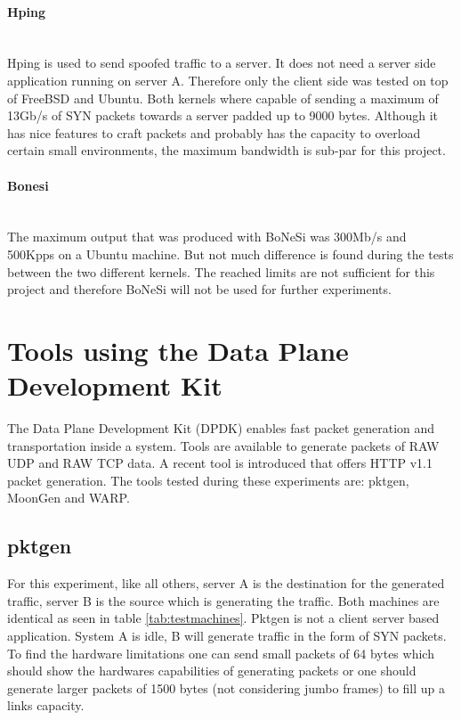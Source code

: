 \paragraph{Hping}\mbox{}\\
Hping is used to send spoofed traffic to a server. 
It does not need a server side application running on server A. Therefore only the client side was tested on top of FreeBSD and Ubuntu.
Both kernels where capable of sending a maximum of 13Gb/s of SYN packets towards a server padded up to 9000 bytes. Although it has nice features to craft packets and probably has the capacity to overload certain small environments, the maximum bandwidth is sub-par for this project.  

\paragraph{Bonesi}\mbox{}\\
The maximum output that was produced with BoNeSi was 300Mb/s and 500Kpps on a Ubuntu machine. 
But not much difference is found during the tests between the two different kernels.
The reached limits are not sufficient for this project and therefore BoNeSi will not be used for further experiments. 

\section{Tools using the Data Plane Development Kit}
The Data Plane Development Kit (DPDK) enables fast packet generation and transportation inside a system. Tools are available to generate packets of RAW UDP and RAW TCP data. A recent tool is introduced that offers HTTP v1.1 packet generation. The tools tested during these experiments are: pktgen, MoonGen and WARP. 

\subsection{pktgen}\label{sub:pktgen}
For this experiment, like all others, server A is the destination for the generated traffic, server B is the source which is generating the traffic. 
Both machines are identical as seen in table \ref{tab:testmachines}. Pktgen is not a client server based application. 
System A is idle, B will generate traffic in the form of SYN packets. 
To find the hardware limitations one can send small packets of 64 bytes which should show the hardwares capabilities of generating packets or one should generate larger packets of 1500 bytes (not considering jumbo frames) to fill up a links capacity.\\
 
